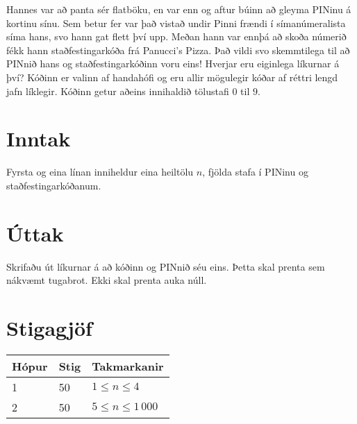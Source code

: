 
Hannes var að panta sér flatböku, en var enn og aftur búinn að gleyma PINinu á kortinu sínu. Sem betur fer var það vistað
undir Pinni frændi í símanúmeralista síma hans, svo hann gat flett því upp. Meðan hann var ennþá að skoða númerið fékk hann
staðfestingarkóða frá Panucci's Pizza. Það vildi svo skemmtilega til að PINnið hans og staðfestingarkóðinn voru eins! Hverjar
eru eiginlega líkurnar á því? Kóðinn er valinn af handahófi og eru allir mögulegir kóðar af réttri lengd jafn líklegir.
Kóðinn getur aðeins innihaldið tölustafi $0$ til $9$.

\section*{Inntak}
Fyrsta og eina línan inniheldur eina heiltölu $n$, fjölda stafa í PINinu og staðfestingarkóðanum. 

\section*{Úttak}
Skrifaðu út líkurnar á að kóðinn og PINnið séu eins. Þetta skal prenta sem nákvæmt tugabrot. Ekki skal prenta auka núll.

\section*{Stigagjöf}
\begin{tabular}{|l|l|l|}
\hline
Hópur & Stig & Takmarkanir \\ \hline
1     & 50   & $1 \leq n \leq 4$ \\ \hline
2     & 50   & $5 \leq n \leq 1\,000$ \\ \hline
\end{tabular}


